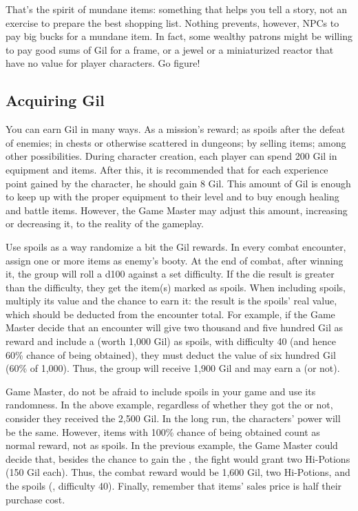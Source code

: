\begin{multicols}{2}
That's the spirit of mundane items: something that helps you tell a story, not an exercise to prepare the best shopping list. Nothing prevents, however, NPCs to pay big bucks for a mundane item. In fact, some wealthy patrons might be willing to pay good sums of Gil for a frame, or a jewel or a miniaturized reactor that have no value for player characters. Go figure!

\subsection{Acquiring Gil}
\label{subsec:inv-acquire}
You can earn Gil in many ways. As a mission’s reward; as spoils after the defeat of enemies; in chests or otherwise scattered in dungeons; by selling items; among other possibilities. During character creation, each player can spend 200 Gil in equipment and items. After this, it is recommended that for each experience point gained by the character, he should gain 8 Gil. This amount of Gil is enough to keep up with the proper equipment to their level and to buy enough healing and battle items. However, the Game Master may adjust this amount, increasing or decreasing it, to the reality of the gameplay.

Use spoils as a way randomize a bit the Gil rewards. In every combat encounter, assign one or more items as enemy’s booty. At the end of combat, after winning it, the group will roll a d100 against a set difficulty. If the die result is greater than the difficulty, they get the item(s) marked as spoils. When including spoils, multiply its value and the chance to earn it: the result is the spoils’ real value, which should be deducted from the encounter total. For example, if the Game Master decide that an encounter will give two thousand and five hundred Gil as reward and include a  (worth 1,000 Gil) as spoils, with difficulty 40 (and hence 60\% chance of being obtained), they must deduct the value of six hundred Gil (60\% of 1,000). Thus, the group will receive 1,900 Gil and may earn a  (or not).

Game Master, do not be afraid to include spoils in your game and use its randomness. In the above example, regardless of whether they got the  or not, consider they received the 2,500 Gil. In the long run, the characters’ power will be the same. However, items with 100\% chance of being obtained count as normal reward, not as spoils. In the previous example, the Game Master could decide that, besides the chance to gain the , the fight would grant two Hi-Potions (150 Gil each). Thus, the combat reward would be 1,600 Gil, two Hi-Potions, and the spoils (, difficulty 40). Finally, remember that items’ sales price is half their purchase cost.


\end{multicols}
